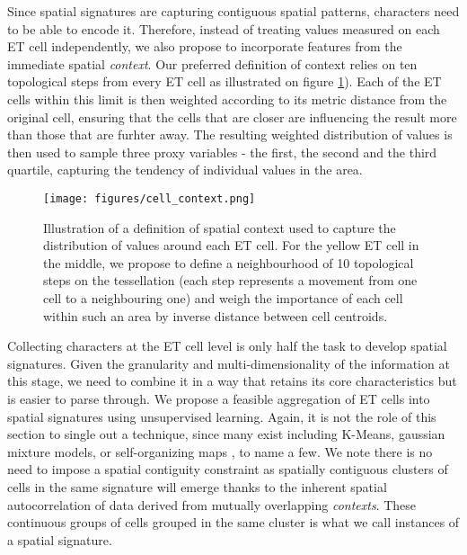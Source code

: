 Since spatial signatures are capturing contiguous spatial patterns, characters need to
be able to encode it. Therefore, instead of treating values measured on each ET cell
independently, we also propose to incorporate features from the immediate spatial \textit{context}.
Our preferred definition of context relies on ten topological steps from every ET cell
as illustrated on figure \ref{fig:context}). Each of the ET
cells within this limit is then weighted according to its metric distance from the
original cell, ensuring that the cells that are closer are influencing the result more
than those that are furhter away. The resulting weighted distribution of values is then
used to sample three proxy variables - the first, the second and the third quartile,
capturing the tendency of individual values in the area.

\begin{figure}
\texttt{[image: figures/cell\_context.png]}
\caption{Illustration of a definition of spatial context used to capture the
distribution of values around each ET cell. For the yellow ET cell in the middle,
we propose to define a neighbourhood of 10 topological steps on the tessellation
(each step represents a movement from one cell to a neighbouring one) and
weigh the importance of each cell within such an area by inverse distance between cell
centroids.}
\label{fig:context}
\end{figure}


Collecting characters at the ET cell level is only half the task to develop
spatial signatures. Given the granularity and multi-dimensionality of the
information at this stage, we need to combine it in a way that retains its
core characteristics but is easier to parse through.
%
We propose a feasible aggregation of ET cells into
spatial signatures using unsupervised learning. Again, it is not the role of
this section to single out a technique, since many exist including K-Means,
gaussian mixture models, or self-organizing maps \citep{kohonen1990self}, to
name a few. We note there is no need to impose a spatial contiguity constraint
as spatially contiguous clusters of cells in the same signature will emerge
thanks to the inherent spatial autocorrelation of data derived from mutually
overlapping \textit{contexts}.
%
These continuous groups of cells grouped in the same cluster is what we call
instances of a spatial signature.
